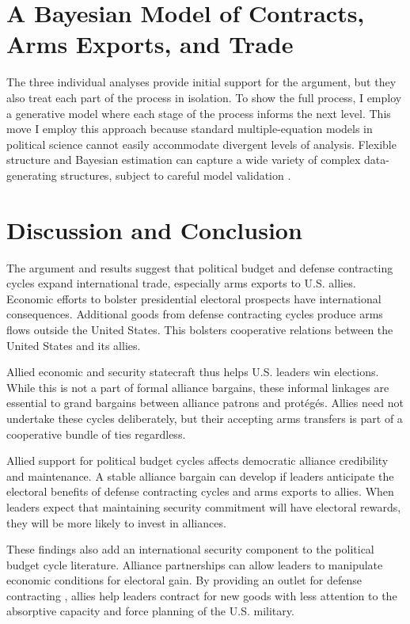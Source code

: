 \documentclass[12pt]{article}
\begin{document}
\section{A Bayesian Model of Contracts, Arms Exports, and Trade}


The three individual analyses provide initial support for the argument, but they also treat each part of the process in isolation. 
To show the full process, I employ a generative model where each stage of the process informs the next level.
This move 
I employ this approach because standard multiple-equation models in political science cannot easily accommodate divergent levels of analysis.
Flexible structure and Bayesian estimation can capture a wide variety of complex data-generating structures, subject to careful model validation \citep{Betancourt2021}. 





\section{Discussion and Conclusion}


The argument and results suggest that political budget and defense contracting cycles expand international trade, especially arms exports to U.S. allies. 
Economic efforts to bolster presidential electoral prospects have international consequences. 
Additional goods from defense contracting cycles produce arms flows outside the United States.
This bolsters cooperative relations between the United States and its allies.


Allied economic and security statecraft thus helps U.S. leaders win elections. 
While this is not a part of formal alliance bargains, these informal linkages are essential to grand bargains between alliance patrons and prot{\'e}g{\'e}s.
Allies need not undertake these cycles deliberately, but their accepting arms transfers is part of a cooperative bundle of ties regardless.


Allied support for political budget cycles affects democratic alliance credibility and maintenance. 
A stable alliance bargain can develop if leaders anticipate the electoral benefits of defense contracting cycles and arms exports to allies.
When leaders expect that maintaining security commitment will have electoral rewards, they will be more likely to invest in alliances. 


These findings also add an international security component to the political budget cycle literature.
Alliance partnerships can allow leaders to manipulate economic conditions for electoral gain. 
By providing an outlet for defense contracting , allies help leaders contract for new goods with less attention to the absorptive capacity and force planning of the U.S. military.
\end{document}
